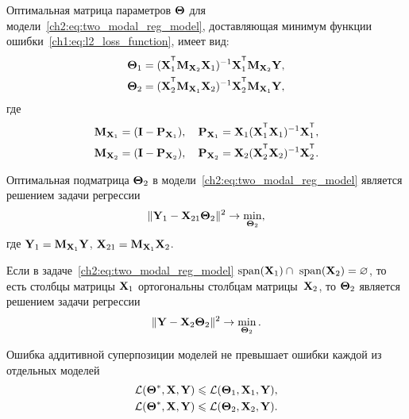 \documentclass[11pt, a5paper]{dissert}
\begin{document}
\begin{statement}
	\label{ch2:stat:two_modal_params}
	Оптимальная матрица параметров $\boldsymbol{\Theta}$ для модели~\eqref{ch2:eq:two_modal_reg_model}, доставляющая минимум функции ошибки~\eqref{ch1:eq:l2_loss_function}, имеет вид:
	\begin{align*}
		\bTheta_1 &= (\bX_1^{\T} \bM_{\bX_2} \bX_1)^{-1} \bX_1^{\T} \bM_{\bX_2} \bY, \\
		\bTheta_2 &= (\bX_2^{\T} \bM_{\bX_1} \bX_2)^{-1} \bX_2^{\T} \bM_{\bX_1} \bY,
	\end{align*}
	где 
	\begin{align*}
		\bM_{\bX_1} = (\bI - \bP_{\bX_1}), \quad \bP_{\bX_1} = \bX_1 (\bX_1^{\T} \bX_1)^{-1} \bX_1^{\T}, \\
		\bM_{\bX_2} = (\bI - \bP_{\bX_2}), \quad \bP_{\bX_2} = \bX_2 (\bX_2^{\T} \bX_2)^{-1} \bX_2^{\T}.
	\end{align*}
\end{statement}

\begin{statement}
	\label{ch2:stat:two_modal_theta2}
	Оптимальная подматрица $\boldsymbol{\Theta}_2$ в модели~\eqref{ch2:eq:two_modal_reg_model} является решением задачи регрессии
	\begin{equation}
		\| \mathbf{Y}_1 -  \mathbf{X}_{21} \boldsymbol{\Theta}_2 \|^2 \rightarrow \min_{\boldsymbol{\Theta}_2},
		\label{ch2:eq:two_modal_fwl}
	\end{equation}
	где $\mathbf{Y}_1 = \mathbf{M}_{\mathbf{X}_1} \mathbf{Y}$, $\mathbf{X}_{21} = \mathbf{M}_{\mathbf{X}_1} \mathbf{X}_2$.
\end{statement}

\begin{statement}
	Если в задаче~\eqref{ch2:eq:two_modal_reg_model} $\text{span}(\mathbf{X}_1) \cap \text{ span}(\mathbf{X}_2) = \varnothing$, то есть столбцы матрицы $\mathbf{X}_1$ ортогональны столбцам матрицы~$\mathbf{X}_2$, то $\boldsymbol{\Theta}_2$ является решением задачи регрессии
	\[
		\| \mathbf{Y} -  \mathbf{X}_{2} \boldsymbol{\Theta}_2 \|^2 \rightarrow \min_{\boldsymbol{\Theta}_2}.
	\]
\end{statement}

\begin{statement}
	Ошибка аддитивной суперпозиции моделей не превышает ошибки каждой из отдельных моделей
	\begin{align*}
		\mathcal{L}(\boldsymbol{\Theta}^*, \mathbf{X}, \mathbf{Y}) &\leqslant \mathcal{L}(\boldsymbol{\Theta}_1, \mathbf{X}_1, \mathbf{Y}), \\
		\mathcal{L}(\boldsymbol{\Theta}^*, \mathbf{X}, \mathbf{Y}) &\leqslant \mathcal{L}(\boldsymbol{\Theta}_2, \mathbf{X}_2, \mathbf{Y}).
	\end{align*}
\end{statement}
\end{document}
